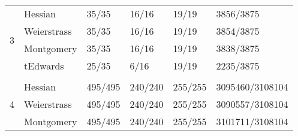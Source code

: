 \begin{table}[!h]
\begin{tabular}{llllll}
\multicolumn{1}{|l|}{\multirow{4}{*}{3}} & \multicolumn{1}{l|}{Hessian}     & \multicolumn{1}{l|}{35/35}                                                        & \multicolumn{1}{l|}{16/16}   & \multicolumn{1}{l|}{19/19}   & \multicolumn{1}{l|}{3856/3875}                                                    \\ \cline{2-6} 
\multicolumn{1}{|l|}{}                   & \multicolumn{1}{l|}{Weierstrass} & \multicolumn{1}{l|}{35/35}                                                        & \multicolumn{1}{l|}{16/16}   & \multicolumn{1}{l|}{19/19}   & \multicolumn{1}{l|}{3854/3875}                                                    \\ \cline{2-6} 
\multicolumn{1}{|l|}{}                   & \multicolumn{1}{l|}{Montgomery}  & \multicolumn{1}{l|}{35/35}                                                        & \multicolumn{1}{l|}{16/16}   & \multicolumn{1}{l|}{19/19}   & \multicolumn{1}{l|}{3838/3875}                                                    \\ \cline{2-6} 
\multicolumn{1}{|l|}{}                   & \multicolumn{1}{l|}{tEdwards}    & \multicolumn{1}{l|}{25/35}                                                        & \multicolumn{1}{l|}{6/16}    & \multicolumn{1}{l|}{19/19}   & \multicolumn{1}{l|}{2235/3875}                                                    \\ \hline \vspace{-3mm}
                                         &                                  &                                                                                   &                              &                              &                                                                                   \\ \hline
\multicolumn{1}{|l|}{\multirow{4}{*}{4}} & \multicolumn{1}{l|}{Hessian}     & \multicolumn{1}{l|}{495/495}                                                      & \multicolumn{1}{l|}{240/240} & \multicolumn{1}{l|}{255/255} & \multicolumn{1}{l|}{3095460/3108104}                                              \\ \cline{2-6} 
\multicolumn{1}{|l|}{}                   & \multicolumn{1}{l|}{Weierstrass} & \multicolumn{1}{l|}{495/495}                                                      & \multicolumn{1}{l|}{240/240} & \multicolumn{1}{l|}{255/255} & \multicolumn{1}{l|}{3090557/3108104}                                              \\ \cline{2-6} 
\multicolumn{1}{|l|}{}                   & \multicolumn{1}{l|}{Montgomery}  & \multicolumn{1}{l|}{495/495}                                                      & \multicolumn{1}{l|}{240/240} & \multicolumn{1}{l|}{255/255} & \multicolumn{1}{l|}{3101711/3108104}                                              \\ \cline{2-6} 

\end{tabular}
\end{table}
